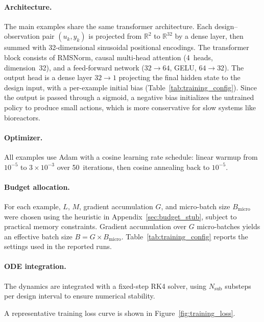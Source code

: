 \paragraph{Architecture.}
The main examples share the same transformer architecture. Each design--observation pair $(u_k, y_k)$ is projected from $\mathbb{R}^2$ to $\mathbb{R}^{32}$ by a dense layer, then summed with 32-dimensional sinusoidal positional encodings. The transformer block consists of RMSNorm, causal multi-head attention (4~heads, dimension~32), and a feed-forward network ($32 \to 64$, GELU, $64 \to 32$). The output head is a dense layer $32 \to 1$ projecting the final hidden state to the design input, with a per-example initial bias (Table~\ref{tab:training_config}). Since the output is passed through a sigmoid, a negative bias initializes the untrained policy to produce small actions, which is more conservative for slow systems like bioreactors.

\paragraph{Optimizer.}
All examples use Adam with a cosine learning rate schedule: linear warmup from $10^{-5}$ to $3 \times 10^{-3}$ over 50~iterations, then cosine annealing back to $10^{-5}$.

\paragraph{Budget allocation.}
For each example, $L$, $M$, gradient accumulation $G$, and micro-batch size $B_{\text{micro}}$ were chosen using the heuristic in Appendix~\ref{sec:budget_stub}, subject to practical memory constraints. Gradient accumulation over $G$ micro-batches yields an effective batch size $B = G \times B_{\text{micro}}$. Table~\ref{tab:training_config} reports the settings used in the reported runs.

\paragraph{ODE integration.}
The dynamics are integrated with a fixed-step RK4 solver, using $N_{\text{sub}}$ substeps per design interval to ensure numerical stability.

A representative training loss curve is shown in Figure~\ref{fig:training_loss}.

